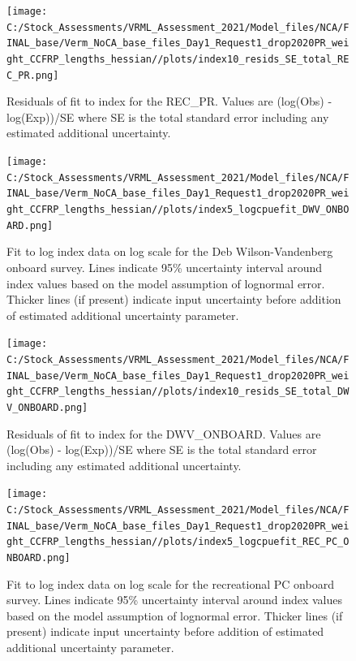 \documentclass[11pt,
  english,
]{article}
\begin{document}
\begin{figure}
\centering
\texttt{[image: C:/Stock\_Assessments/VRML\_Assessment\_2021/Model\_files/NCA/FINAL\_base/Verm\_NoCA\_base\_files\_Day1\_Request1\_drop2020PR\_weight\_CCFRP\_lengths\_hessian//plots/index10\_resids\_SE\_total\_REC\_PR.png]}
\caption{Residuals of fit to index for the REC\_PR. Values are (log(Obs) - log(Exp))/SE where SE is the total standard error including any estimated additional uncertainty.\label{fig:cpue-resid-REC-PR}}
\end{figure}

\begin{figure}
\centering
\texttt{[image: C:/Stock\_Assessments/VRML\_Assessment\_2021/Model\_files/NCA/FINAL\_base/Verm\_NoCA\_base\_files\_Day1\_Request1\_drop2020PR\_weight\_CCFRP\_lengths\_hessian//plots/index5\_logcpuefit\_DWV\_ONBOARD.png]}
\caption{Fit to log index data on log scale for the Deb Wilson-Vandenberg onboard survey. Lines indicate 95\% uncertainty interval around index values based on the model assumption of lognormal error. Thicker lines (if present) indicate input uncertainty before addition of estimated additional uncertainty parameter.\label{fig:log-cpue-DWV-ONBOARD}}
\end{figure}

\begin{figure}
\centering
\texttt{[image: C:/Stock\_Assessments/VRML\_Assessment\_2021/Model\_files/NCA/FINAL\_base/Verm\_NoCA\_base\_files\_Day1\_Request1\_drop2020PR\_weight\_CCFRP\_lengths\_hessian//plots/index10\_resids\_SE\_total\_DWV\_ONBOARD.png]}
\caption{Residuals of fit to index for the DWV\_ONBOARD. Values are (log(Obs) - log(Exp))/SE where SE is the total standard error including any estimated additional uncertainty.\label{fig:cpue-resid-DWV-ONBOARD}}
\end{figure}

\begin{figure}
\centering
\texttt{[image: C:/Stock\_Assessments/VRML\_Assessment\_2021/Model\_files/NCA/FINAL\_base/Verm\_NoCA\_base\_files\_Day1\_Request1\_drop2020PR\_weight\_CCFRP\_lengths\_hessian//plots/index5\_logcpuefit\_REC\_PC\_ONBOARD.png]}
\caption{Fit to log index data on log scale for the recreational PC onboard survey. Lines indicate 95\% uncertainty interval around index values based on the model assumption of lognormal error. Thicker lines (if present) indicate input uncertainty before addition of estimated additional uncertainty parameter.\label{fig:log-cpue-REC-PC-ONBOARD}}
\end{figure}
\end{document}
